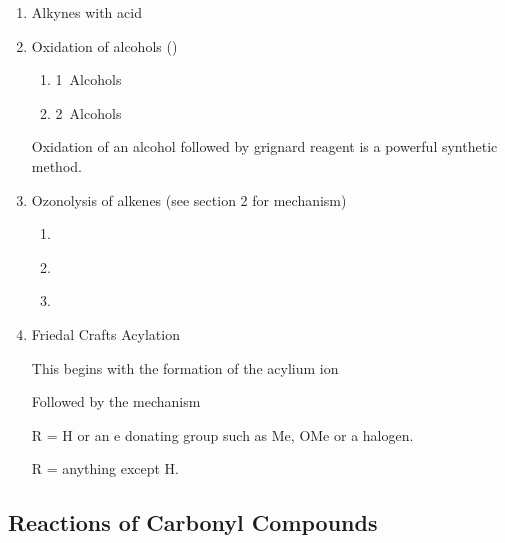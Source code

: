 \begin{enumerate}[label=\alph*)]

  \item Alkynes with acid

  \item Oxidation of alcohols ()

    \begin{enumerate}[label=\roman*)]

      \item 1\de\ Alcohols

      \item 2\de\ Alcohols

    \end{enumerate}

    Oxidation of an alcohol followed by grignard reagent is a powerful synthetic
    method.

  \item Ozonolysis of alkenes (see section 2 for mechanism)

    \begin{enumerate}[label=\roman*)]

      \item\

      \item\

      \item\

    \end{enumerate}

  \item Friedal Crafts Acylation


    This begins with the formation of the acylium ion


    Followed by the mechanism


    R = H or an e\super{-} donating group such as Me, OMe or a halogen.

    R = anything except H.

\end{enumerate}

\subsection{Reactions of Carbonyl Compounds}

